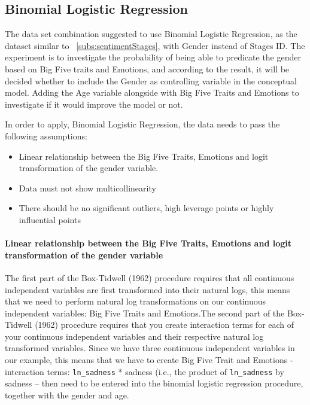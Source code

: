 \documentclass{llncs}
\begin{document}
\subsection{Binomial Logistic Regression}\label{BioGenderAge}

The data set combination suggested to use Binomial Logistic Regression, as the dataset similar to ~\ref{subs:sentimentStages}, with Gender instead of Stages ID. The experiment is to investigate the probability of being able to predicate the gender based on Big Five traits and Emotions, and according to the result, it will be decided whether to include the Gender as controlling variable in the conceptual model. Adding the Age variable alongside with Big Five Traits and Emotions to investigate if it would improve the model or not.

In order to apply, Binomial Logistic Regression, the data needs to pass the following assumptions:

\begin{itemize}
\item
Linear relationship between the Big Five Traits, Emotions and logit transformation of the gender variable. 
\item
Data must not show multicollinearity
\item
There should be no significant outliers, high leverage points or highly influential points
\end{itemize}

\paragraph{Linear relationship between the Big Five Traits, Emotions and logit transformation of the \textbf{gender} variable}

The first part of the Box-Tidwell (1962) procedure requires that all continuous independent variables are first transformed into their natural logs, this means that we need to perform natural log transformations on our continuous independent variables: Big Five Traits and Emotions.The second part of the Box-Tidwell (1962) procedure requires that you create interaction terms for each of your continuous independent variables and their respective natural log transformed variables. Since we have three continuous independent variables in our example, this means that we have to create Big Five Trait and Emotions - interaction terms: \verb|ln_sadness| \mbox{*} sadness (i.e., the product of \verb|ln_sadness| by sadness – then need to be entered into the binomial logistic regression procedure, together with the gender and age.
\end{document}
